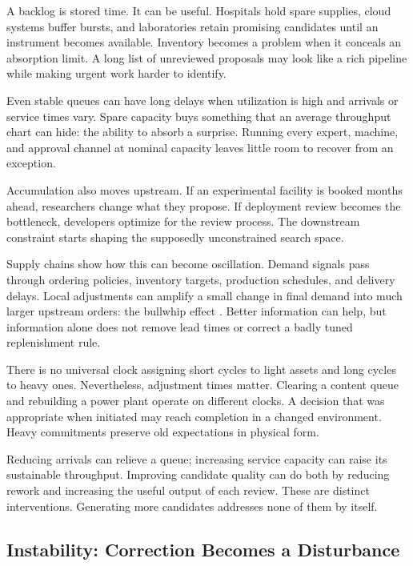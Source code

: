 A backlog is stored time. It can be useful. Hospitals hold spare supplies, cloud systems buffer bursts, and laboratories retain promising candidates until an instrument becomes available. Inventory becomes a problem when it conceals an absorption limit. A long list of unreviewed proposals may look like a rich pipeline while making urgent work harder to identify.

Even stable queues can have long delays when utilization is high and arrivals or service times vary. Spare capacity buys something that an average throughput chart can hide: the ability to absorb a surprise. Running every expert, machine, and approval channel at nominal capacity leaves little room to recover from an exception.

Accumulation also moves upstream. If an experimental facility is booked months ahead, researchers change what they propose. If deployment review becomes the bottleneck, developers optimize for the review process. The downstream constraint starts shaping the supposedly unconstrained search space.

Supply chains show how this can become oscillation. Demand signals pass through ordering policies, inventory targets, production schedules, and delivery delays. Local adjustments can amplify a small change in final demand into much larger upstream orders: the bullwhip effect \cite{lee1997information}. Better information can help, but information alone does not remove lead times or correct a badly tuned replenishment rule.

There is no universal clock assigning short cycles to light assets and long cycles to heavy ones. Nevertheless, adjustment times matter. Clearing a content queue and rebuilding a power plant operate on different clocks. A decision that was appropriate when initiated may reach completion in a changed environment. Heavy commitments preserve old expectations in physical form.

Reducing arrivals can relieve a queue; increasing service capacity can raise its sustainable throughput. Improving candidate quality can do both by reducing rework and increasing the useful output of each review. These are distinct interventions. Generating more candidates addresses none of them by itself.

\subsection{Instability: Correction Becomes a Disturbance}

